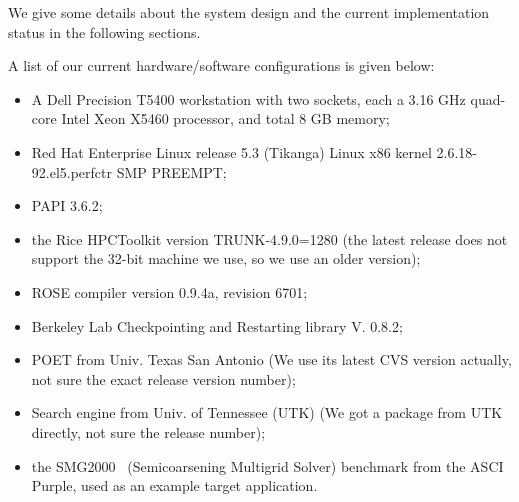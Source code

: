 We give some details about the system design and the current implementation
status in the following sections. 

A list of our current hardware/software configurations is given below:
\begin{itemize}
   \item A Dell Precision T5400 workstation with two sockets, each a 3.16
   GHz quad-core Intel Xeon X5460 processor, and total 8 GB memory; 
   \item Red Hat Enterprise Linux release 5.3 (Tikanga) Linux x86 kernel
   2.6.18-92.el5.perfctr SMP PREEMPT;
   \item PAPI 3.6.2;
   \item the Rice HPCToolkit version TRUNK-4.9.0=1280 (the latest
         release does not support the 32-bit machine we use, so we use an
         older version); 
   \item ROSE compiler version 0.9.4a, revision 6701;
   \item Berkeley Lab Checkpointing and Restarting library V. 0.8.2;
   \item POET from Univ. Texas San Antonio (We use its latest CVS version
         actually, not sure the exact release version number);
   \item Search engine from Univ. of Tennessee (UTK) (We got a package from
         UTK directly, not sure the release number); 
   \item the SMG2000~\cite{BrownSemicoarsening2000} (Semicoarsening Multigrid
         Solver) benchmark from the ASCI Purple, used as an example target
         application.
\end{itemize}



